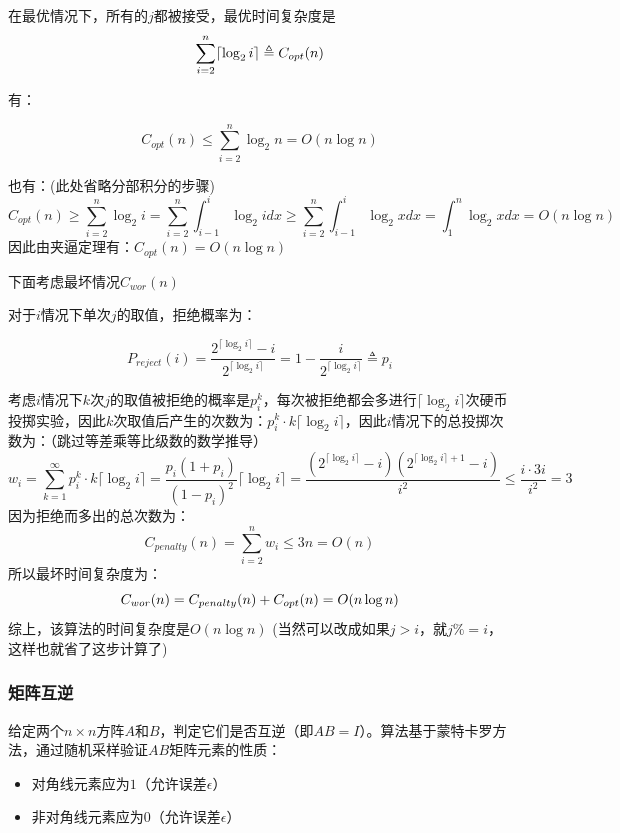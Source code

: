 \documentclass[./../main.tex]{subfiles} %
\begin{document}
在最优情况下，所有的$j$都被接受，最优时间复杂度是
\begin{equation*}
    \sum_{i=2}^n\lceil\log_2i\rceil\triangleq C_{opt}(n)\\
\end{equation*}

有：

$$
C_{opt}(n)\le \sum_{i=2}^n\log_2n=O(n\log n)
$$

也有：(此处省略分部积分的步骤)
$$
C_{opt}(n)\ge\sum_{i=2}^n\log_2 i=\sum_{i=2}^n\int_{i-1}^{i}\log_2idx\ge\sum_{i=2}^n\int_{i-1}^{i}\log_2xdx=\int_{1}^n\log_2xdx=O(n\log n)
$$
因此由夹逼定理有：$C_{opt}(n)=O(n\log n)$

下面考虑最坏情况$C_{wor}(n)$


对于$i$情况下单次$j$的取值，拒绝概率为：

\begin{equation*}
    P_{reject}(i)=\frac{2^{\lceil\log_2i\rceil}-i}{2^{\lceil\log_2i\rceil}}=1-\frac{i}{2^{\lceil\log_2i\rceil}}\triangleq p_i
\end{equation*}


考虑$i$情况下$k$次$j$的取值被拒绝的概率是$p_i^k$，每次被拒绝都会多进行$\lceil\log_2i\rceil$次硬币投掷实验，因此$k$次取值后产生的次数为：$p_{i}^{k}\cdot k\lceil\log_2i\rceil$，因此$i$情况下的总投掷次数为：（跳过等差乘等比级数的数学推导）
$$
w_i=\sum_{k=1}^\infty p_{i}^{k}\cdot k\lceil\log_2i\rceil=\frac{p_i(1+p_i)}{(1-p_i)^2}\lceil\log_2i\rceil=\frac{(2^{\lceil\log_2i\rceil}-i)(2^{\lceil\log_2i\rceil+1}-i)}{i^2}\le\frac{i\cdot3i}{i^2}=3
$$
因为拒绝而多出的总次数为：
$$
C_{penalty}(n)=\sum_{i=2}^nw_i\le 3n=O(n)
$$
所以最坏时间复杂度为：
$$
C_{wor}(n)=C_{penalty}(n)+C_{opt}(n)=O(n\log n)\\
$$
综上，该算法的时间复杂度是$O(n\log n)$
(当然可以改成如果$j>i$，就$j \%=i$，这样也就省了这步计算了)


\subsubsection{矩阵互逆}
给定两个$n \times n$方阵$A$和$B$，判定它们是否互逆（即$AB = I$）。算法基于蒙特卡罗方法，通过随机采样验证$AB$矩阵元素的性质：
\begin{itemize}
    \item 对角线元素应为$1$（允许误差$\epsilon$）
    \item 非对角线元素应为$0$（允许误差$\epsilon$）
\end{itemize}

\begin{algorithm}[H]
\SetAlgoLined
{}
\end{algorithm}
\end{document}

